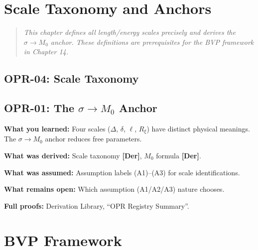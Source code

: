 \documentclass[11pt,a4paper]{book}
\theoremstyle{definition}
\theoremstyle{remark}
\newcommand{\tagDer}{\textcolor{derivedColor}{\textbf{[Der]}}}
\begin{document}
\chapter{Scale Taxonomy and Anchors}
\label{ch:scale_taxonomy}

\begin{quote}
\textit{This chapter defines all length/energy scales precisely and derives
the $\sigma \to M_0$ anchor. These definitions are prerequisites for the
BVP framework in Chapter 14.}
\end{quote}

\section{OPR-04: Scale Taxonomy}
\label{sec:opr04}



\section{OPR-01: The $\sigma \to M_0$ Anchor}
\label{sec:opr01}



\begin{chapterRecap}
\textbf{What you learned:} Four scales ($\Delta$, $\delta$, $\ell$, $R_\xi$) have
distinct physical meanings. The $\sigma \to M_0$ anchor reduces free parameters.

\textbf{What was derived:} Scale taxonomy \tagDer{}, $M_0$ formula \tagDer{}.

\textbf{What was assumed:} Assumption labels (A1)--(A3) for scale identifications.

\textbf{What remains open:} Which assumption (A1/A2/A3) nature chooses.

\textbf{Full proofs:} Derivation Library, ``OPR Registry Summary''.
\end{chapterRecap}

\chapter{BVP Framework}
\label{ch:bvp_framework}
\label{ch:bvp_master_key}%
\end{document}
